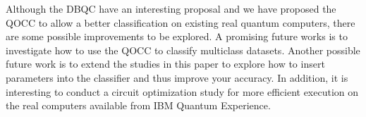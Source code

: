\documentclass{esannV2}
\begin{document}
Although the DBQC have an interesting proposal and we have proposed the QOCC to allow a better classification on existing real quantum computers, there are some possible improvements to be explored. A promising future works is to investigate how to use the QOCC to classify multiclass datasets. Another possible future work is to extend the studies in this paper to explore how to insert parameters into the classifier and thus improve your accuracy. In addition, it is interesting to conduct a circuit optimization study for more efficient execution on the real computers available from IBM Quantum Experience.


\begin{footnotesize}




\end{footnotesize}

\end{document}
